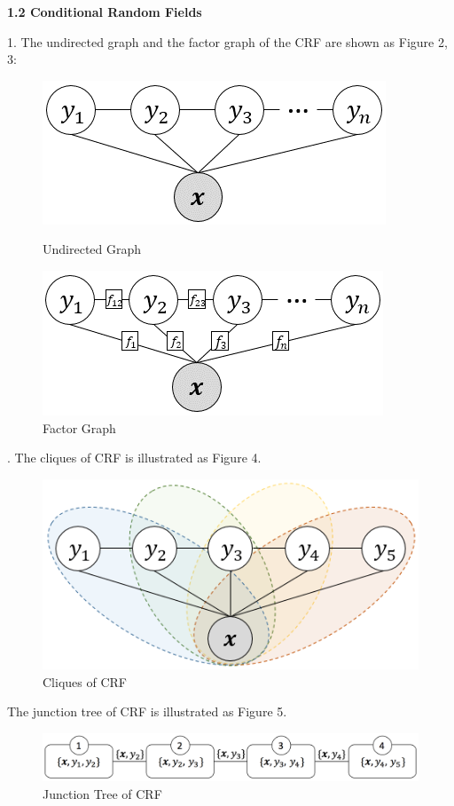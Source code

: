 \documentclass[12pt]{article}
\begin{document}
\bigskip
{\bf 1.2 Conditional Random Fields}
\smallskip\par
1. The undirected graph and the factor graph of the CRF are shown as Figure 2, 3:
\begin{figure}[ht]
\begin{minipage}[t]{0.5\textwidth}
\centering
\includegraphics[scale=0.58]{undirected.png}
\caption{Undirected Graph}
\end{minipage}
\begin{minipage}[t]{0.5\textwidth}
\centering
\includegraphics[scale=0.58]{factor_graph.png}
\caption{Factor Graph}
\end{minipage}
\end{figure}
. The cliques of CRF is illustrated as Figure 4.
\begin{figure}[ht]
\centering
\includegraphics[scale=0.58]{clique.png}
\caption{Cliques of CRF}
\end{figure}
\par
The junction tree of CRF is illustrated as Figure 5.
\begin{figure}[ht]
\centering
\includegraphics[scale=0.5]{junction_tree.png}
\caption{Junction Tree of CRF}
\end{figure}
\end{document}
